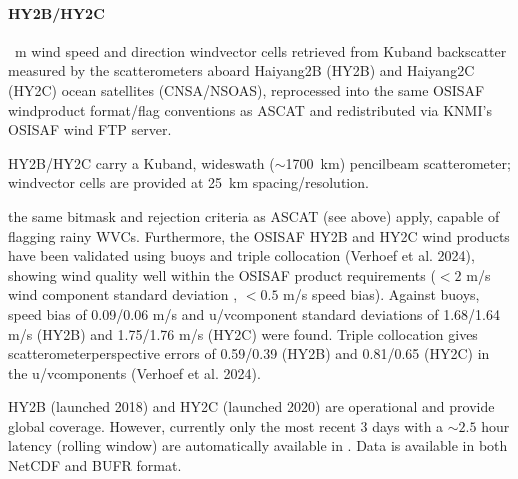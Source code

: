 \documentclass[a4paper,10pt,english]{sphinxmanual}
\begin{document}
\paragraph{HY\sphinxhyphen{}2B/HY\sphinxhyphen{}2C}
\label{\detokenize{05_reference_datasets:hy-2b-hy-2c}}
\sphinxAtStartPar
{}

 m wind speed and direction wind\sphinxhyphen{}vector cells retrieved from Ku\sphinxhyphen{}band backscatter measured by the scatterometers aboard Haiyang\sphinxhyphen{}2B (HY\sphinxhyphen{}2B) and Haiyang\sphinxhyphen{}2C (HY\sphinxhyphen{}2C) ocean satellites (CNSA/NSOAS), reprocessed into the same OSI\sphinxhyphen{}SAF wind\sphinxhyphen{}product format/flag conventions as ASCAT and redistributed via KNMI’s OSI\sphinxhyphen{}SAF wind FTP server.

\sphinxAtStartPar
{}

\sphinxAtStartPar
HY\sphinxhyphen{}2B/HY\sphinxhyphen{}2C carry a Ku\sphinxhyphen{}band, wide\sphinxhyphen{}swath (\(\sim\)1700 km) pencil\sphinxhyphen{}beam scatterometer; wind\sphinxhyphen{}vector cells are provided at 25 km spacing/resolution.

\sphinxAtStartPar
{}

\sphinxAtStartPar
the same  bitmask and rejection criteria as ASCAT (see above) apply, capable of flagging rainy WVCs. Furthermore, the OSI\sphinxhyphen{}SAF HY\sphinxhyphen{}2B and HY\sphinxhyphen{}2C wind products have been validated using buoys and triple collocation (Verhoef et al. 2024), showing wind quality well within the OSI\sphinxhyphen{}SAF product requirements (\(<2\) m/s wind component standard deviation , \(<0.5\) m/s speed bias). Against buoys, speed bias of \sphinxhyphen{}0.09/\sphinxhyphen{}0.06 m/s and u\sphinxhyphen{}/v\sphinxhyphen{}component standard deviations of 1.68/1.64 m/s (HY\sphinxhyphen{}2B) and 1.75/1.76 m/s (HY\sphinxhyphen{}2C) were found. Triple collocation gives scatterometer\sphinxhyphen{}perspective errors of 0.59/0.39 (HY\sphinxhyphen{}2B) and 0.81/0.65 (HY\sphinxhyphen{}2C) in the u\sphinxhyphen{}/v\sphinxhyphen{}components (Verhoef et al. 2024).

\sphinxAtStartPar
{}

\sphinxAtStartPar
HY\sphinxhyphen{}2B (launched 2018) and HY\sphinxhyphen{}2C (launched 2020) are operational and provide global coverage. However, currently only the most recent 3 days with a \(\sim2.5\) hour latency (rolling window) are automatically available in . Data is available in both NetCDF and BUFR format.
\end{document}
